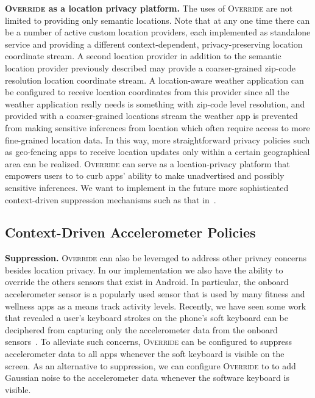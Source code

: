 \documentclass[10pt]{sensys-proc}
\begin{document}
\textbf{\textsc{Override} as a location privacy platform.} The uses of \textsc{Override} are not limited to providing only semantic locations. Note that at any one time there can be a number of active custom location providers, each implemented as standalone service and providing a different context-dependent, privacy-preserving location coordinate stream. A second location provider in addition to the semantic location provider previously described may provide a coarser-grained zip-code resolution location coordinate stream. A location-aware weather application can be configured to receive location coordinates from this provider since all the weather application really needs is something with zip-code level resolution, and provided with a coarser-grained locations stream the weather app is prevented from making sensitive inferences from location which often require access to more fine-grained location data. In this way, more straightforward privacy policies such as geo-fencing apps to receive location updates only within a certain geographical area can be realized. \textsc{Override} can serve as a location-privacy platform that empowers users to to curb apps' ability to make unadvertised and possibly sensitive inferences. We want to implement in the future more sophisticated context-driven suppression mechanisms such as that in~\cite{Gotz:MaskIt}.

\subsection{Context-Driven Accelerometer Policies}
\textbf{Suppression.} \textsc{Override} can also be leveraged to address other privacy concerns besides location privacy. In our implementation we also have the ability to override the others sensors that exist in Android. In particular, the onboard accelerometer sensor is a popularly used sensor that is used by many fitness and wellness apps as a means track activity levels. Recently, we have seen some work that revealed a user's keyboard strokes on the phone's soft keyboard can be deciphered from capturing only the accelerometer data from the onboard sensors~\cite{Keyboard}. To alleviate such concerns, \textsc{Override} can be configured to suppress accelerometer data to all apps whenever the soft keyboard is visible on the screen. As an alternative to suppression, we can configure \textsc{Override} to to add Gaussian noise to the accelerometer data whenever the software keyboard is visible.
\end{document}
